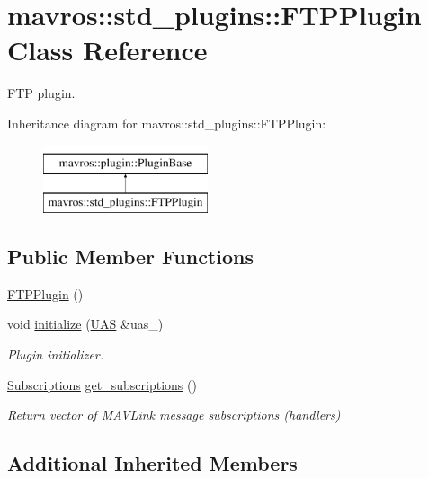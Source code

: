\hypertarget{classmavros_1_1std__plugins_1_1FTPPlugin}{}\section{mavros\+::std\+\_\+plugins\+::F\+T\+P\+Plugin Class Reference}
\label{classmavros_1_1std__plugins_1_1FTPPlugin}


F\+TP plugin.  


Inheritance diagram for mavros\+::std\+\_\+plugins\+::F\+T\+P\+Plugin\+:\begin{figure}[H]
\begin{center}
\leavevmode
\includegraphics[height=2.000000cm]{classmavros_1_1std__plugins_1_1FTPPlugin}
\end{center}
\end{figure}
\subsection*{Public Member Functions}
\begin{DoxyCompactItemize}
\item 
\mbox{\hyperlink{group__plugin_ga1afc00106987fdf68c2435abdaa93e4c}{F\+T\+P\+Plugin}} ()
\item 
void \mbox{\hyperlink{group__plugin_ga7249eb6cdb3de93652df3b8cf3ea53c0}{initialize}} (\mbox{\hyperlink{classmavros_1_1UAS}{U\+AS}} \&uas\+\_\+)
\begin{DoxyCompactList}\small\item\em Plugin initializer. \end{DoxyCompactList}\item 
\mbox{\hyperlink{group__plugin_ga8967d61fc77040e0c3ea5a4585d62a09}{Subscriptions}} \mbox{\hyperlink{group__plugin_ga75b1dc5d6bd1dc976c4a974b93d03e92}{get\+\_\+subscriptions}} ()
\begin{DoxyCompactList}\small\item\em Return vector of M\+A\+V\+Link message subscriptions (handlers) \end{DoxyCompactList}\end{DoxyCompactItemize}
\subsection*{Additional Inherited Members}


